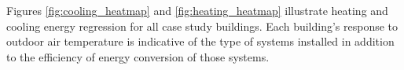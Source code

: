 Figures \ref{fig:cooling_heatmap} and \ref{fig:heating_heatmap} illustrate heating and cooling energy regression for all case study buildings. Each building's response to outdoor air temperature is indicative of the type of systems installed in addition to the efficiency of energy conversion of those systems.